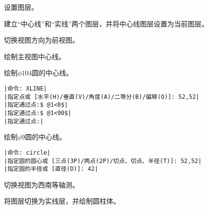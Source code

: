 
\begin{procedure}
\item 设置图层。

建立“中心线”和“实线”两个图层，并将中心线图层设置为当前图层。
\item 切换视图方向为前视图。

\item 绘制主视图中心线。

绘制$\phi 104$圆的中心线。
\begin{lstlisting}
|命令: XLINE|
|指定点或 [水平(H)/垂直(V)/角度(A)/二等分(B)/偏移(O)]: 52,52|
|指定通过点:$ @1<0$|
|指定通过点:$ @1<90$|
|指定通过点:|
\end{lstlisting}
绘制$\phi 9$圆的中心线。
\begin{lstlisting}
|命令: circle|
|指定圆的圆心或 [三点(3P)/两点(2P)/切点、切点、半径(T)]: 52,52|
|指定圆的半径或 [直径(D)]: 42|
\end{lstlisting}
\item 切换视图为西南等轴测。
\item 将图层切换为实线层，并绘制圆柱体。


\end{procedure}
